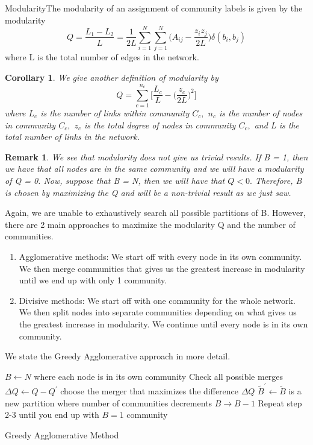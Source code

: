 \documentclass[twoside]{article}
\newtheorem{corollary}[theorem]{Corollary}
\newtheorem{remark}[theorem]{Remark}
\begin{document}
\begin{definition_exam}{Modularity}{}The modularity of an assignment of community labels is given by the modularity 
$$
Q = \frac{L_1 - L_2}{L} = \frac{1}{2L}\sum_{i=1}^{N}\sum_{j=1}^{N}\bigg(A_{ij} - \frac{z_iz_j}{2L} \bigg)\delta(b_i, b_j)
$$
where L is the total number of edges in the network.
\end{definition_exam}

\begin{corollary} We give another definition of modularity by 
$$
Q = \sum_{c=1}^{n_c}\bigg[\frac{L_c}{L} - \bigg(\frac{z_c}{2L} \bigg)^2 \bigg]
$$
where $L_c$ is the number of links within community $C_c,$ $n_c$ is the number of nodes in community $C_c,$ $z_c$ is the total degree of nodes in community $C_c,$ and L is the total number of links in the network.
\end{corollary}

\begin{remark}We see that modularity does not give us trivial results. If B = 1, then we have that all nodes are in the same community and we will have a modularity of Q = 0. Now, suppose that B = N, then we will have that $Q < 0.$ Therefore, B is chosen by maximizing the Q and will be a non-trivial result as we just saw.
\end{remark}

Again, we are unable to exhaustively search all possible partitions of B. However, there are 2 main approaches to maximize the modularity Q and the number of communities.
\begin{enumerate}
\item Agglomerative methods: We start off with every node in its own community. We then merge communities that gives us the greatest increase in modularity until we end up with only 1 community.
\item Divisive methods: We start off with one community for the whole network. We then split nodes into separate communities depending on what gives us the greatest increase in modularity. We continue until every node is in its own community.
\end{enumerate}

We state the Greedy Agglomerative approach in more detail.

\begin{algorithm}
\DontPrintSemicolon
{}
$B \gets N$ where each node is in its own community\;
Check all possible merges\;
$\Delta Q \gets Q - Q^{'}$ choose the merger that maximizes the difference $\Delta Q$\;
$\tilde{B}^{'} \gets \tilde{B}$ is a new partition where number of communities decrements $B \rightarrow B - 1$\;
Repeat step 2-3 until you end up with $B = 1$ community\;
\;
\caption{{\sc Greedy Agglomerative Method}}
\label{algo:duplicate}
\end{algorithm}
\end{document}
